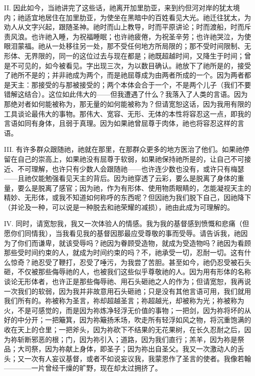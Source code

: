 II. 因此如今，当祂讲完了这些话，祂离开加里肋亚，来到约但河对岸的犹太境内；祂适宜地居住在加里肋亚，为使坐在黑暗中的百姓看见大光。祂迁往犹太，为劝人从文字兴起，跟随圣神。祂时而山上教导，时而平原讲论；时而渡船，时而斥责风浪。也许祂入睡，为祝福睡眠；也许祂疲倦，为祝圣辛劳；也许祂哭泣，为使眼泪蒙福。祂从一处移往另一处，那不受任何地方所局限的；那不受时间限制、无形体、无界限的，同一的这位过去与现在都是；祂既超越时间，又降生于时间；曾是不可见的，如今被看见。字出现三次，为以数目确认。祂放下了祂所是的，接受了祂所不是的；并非祂成为两个，而是祂屈尊成为由两者所成的一个。因为两者都是天主：那接受的与那被接受的；两个本体会合于一个，不是两个儿子（我们不要错解这结合）。这位如此伟大的——但我遭遇了什么？我落入了人类的言语。因为那绝对者如何能被称为，那无量的如何能被称为？但请宽恕这话，因为我用有限的工具谈论最伟大的事物。那伟大、宽容、无形、无体的本性将容忍这一点，即我的言语如同有身体，且弱于真理。因为如果祂曾屈尊于肉体，祂也将容忍这样的言语。\par

III. 有许多群众跟随祂，祂就在那里，在那群众更多的地方医治了他们。如果祂停留在自己的崇高上，如果祂没有屈尊于软弱，如果祂保持祂所是的，让自己不可接近、不可理解，也许只有少数人会跟随祂——也许连少数也没有，或许只有梅瑟——且祂仅能勉强看见天主的背后。因为祂穿透了云彩，要么是脱离了身体的重量，要么是脱离了感官；因为祂，作为有形体、使用物质眼睛的，怎能凝视天主的精妙、无形体，或我不知道如何称呼的东西呢？但因祂为我们脱下自己，因祂降下（并论及一种，可以说是一种脱去和祂荣耀的减损），祂由此成为可理解的。\par

IV. 同时，请宽恕我，我又一次体验人的情感。我为我的基督感到愤慨和悲痛（但愿你们同情我），当我看见我的基督因那最应受尊敬的事而受辱。请告诉我，祂因为了你们而谦卑，就该受辱吗？祂因为眷顾受造物，就成为受造物吗？祂因为看顾那些受时间约束的人，就成为时间约束的吗？不，祂承受一切，忍耐一切。这有什么惊奇？祂忍受了鞭打，忍受了唾污，为我尝了苦胆。甚至如今，祂仍忍受被石头砸，不仅被那些侮辱祂的人，也被我们这些似乎尊敬祂的人。因为用有形体的名称谈论无形体者，也许正是那些侮辱祂、用石头砸祂之人的作为；但请宽恕，我再说一次我们的软弱，因为我并非故意用石头砸祂；只是没有其他言语可用，我们就用我们所有的。祢被称为圣言，祢却超越圣言；祢超越光，却被称为光；祢被称为火，不是可感觉的，而是因为祢炼净轻浮无价值的事物；一把剑，因为祢将坏的从好的中分开；一把簸箕，因为祢簸扬禾场，吹走所有轻浮如风之物，将沉重饱满的收在天上的仓里；一把斧头，因为祢砍下不结果的无花果树，在长久忍耐之后，因为祢斩断邪恶的根；门，因为祢引入；道路，因为我们直行；羔羊，因为祢是祭品；大司祭，因为祢献上身体，即圣子；因为祢出自圣父。我又一次激动人的舌头；又一次有人妄议基督，或者不如说妄议我，我蒙恩作了圣言的使者。我像若翰————一片曾经干燥的旷野，现在却太过拥挤了。\par

